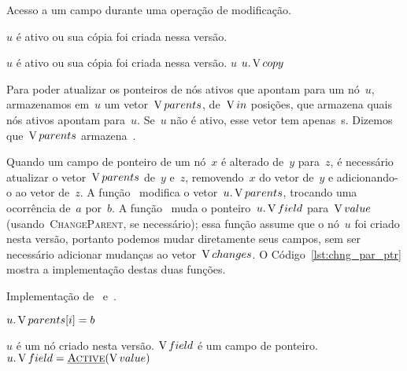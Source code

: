 \documentclass[main.tex]{subfiles}
\begin{document}
\begin{algorithm}
\caption{Acesso a um campo durante uma operação de modificação.} \label{lst:acc_mod}
\begin{algorithmic}[1]

\Require $u$ é ativo ou sua cópia foi criada nessa versão.
	\State \Return {}
\EndFunction

\Require $u$ é ativo ou sua cópia foi criada nessa versão.
		\State \Return $u$
	\Else
		\State \Return $u.\operatorname{V}{copy}$
	\EndIf
\EndFunction

\end{algorithmic}
\end{algorithm}

Para poder atualizar os ponteiros de nós ativos que apontam para um nó~$u$, armazenamos em~$u$ um vetor~$\operatorname{V}{parents}$, de~$\operatorname{V}{in}$ posições, que armazena quais nós ativos apontam para~$u$. Se~$u$ não é ativo, esse vetor tem apenas~s. Dizemos que~$\operatorname{V}{parents}$ armazena~.

Quando um campo de ponteiro de um nó~$x$ é alterado de~$y$ para~$z$, é necessário atualizar o vetor~$\operatorname{V}{parents}$ de~$y$ e~$z$, removendo~$x$ do vetor de~$y$ e adicionando-o ao vetor de~$z$. A função~\mbox{} modifica o vetor~$u.\operatorname{V}{parents}$, trocando uma ocorrência de~$a$ por~$b$. A função~\mbox{} muda o ponteiro~$u.\operatorname{V}{field}$ para~$\operatorname{V}{value}$ (usando~\textsc{ChangeParent}, se necessário); essa função assume que o nó~$u$ foi criado nesta versão, portanto podemos mudar diretamente seus campos, sem ser necessário adicionar mudanças ao vetor~$\operatorname{V}{changes}$. O Código~\ref{lst:chng_par_ptr} mostra a implementação destas duas funções.

\begin{algorithm}
\caption{Implementação de~\textsc{} e~\textsc{}.} \label{lst:chng_par_ptr}
\begin{algorithmic}[1]

			\State $u.\operatorname{V}{parents}[i] = b$
			\State \Break
		\EndIf
	\EndFor
\EndFunction

\Require $u$ é um nó criado nesta versão.
\Require $\operatorname{V}{field}$ é um campo de ponteiro.
		\State {}
	\EndIf
	\State $u.\V{field} = \Call{\auxfunc{Active}}{\V{value}}$ 
		\State {}
	\EndIf
\EndFunction

\end{algorithmic}
\end{algorithm}
\end{document}
